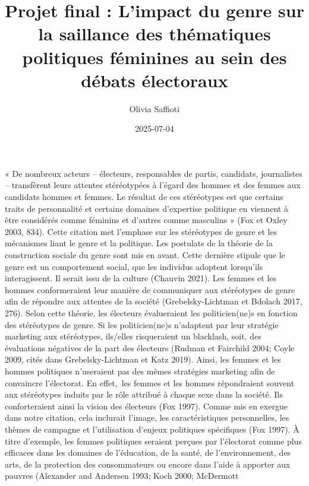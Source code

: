\documentclass[
  letterpaper,
  DIV=11,
  numbers=noendperiod]{scrartcl}
\title{Projet final : L'impact du genre sur la saillance des thématiques
politiques féminines au sein des débats électoraux}
\author{Olivia Saffioti}
\date{2025-07-04}
\begin{document}
\maketitle
\ifdefined\Shaded\renewenvironment{Shaded}{\begin{tcolorbox}[boxrule=0pt, enhanced, borderline west={3pt}{0pt}{shadecolor}, interior hidden, sharp corners, breakable, frame hidden]}{\end{tcolorbox}}\fi

« De nombreux acteurs -- électeurs, responsables de partis, candidats,
journalistes -- transfèrent leurs attentes stéréotypées à l'égard des
hommes et des femmes aux candidats hommes et femmes. Le résultat de ces
stéréotypes est que certains traits de personnalité et certains domaines
d'expertise politique en viennent à être considérés comme féminins et
d'autres comme masculins » (Fox et Oxley 2003, 834). Cette citation met
l'emphase sur les stéréotypes de genre et les mécanismes liant le genre
et la politique. Les postulats de la théorie de la construction sociale
du genre sont mis en avant. Cette dernière stipule que le genre est un
comportement social, que les individus adoptent lorsqu'ils
interagissent. Il serait issu de la culture (Chauvin 2021). Les femmes
et les hommes conformeraient leur manière de communiquer aux stéréotypes
de genre afin de répondre aux attentes de la société (Grebelsky-Lichtman
et Bdolach 2017, 276). Selon cette théorie, les électeurs évalueraient
les politicien(ne)s en fonction des stéréotypes de genre. Si les
politicien(ne)s n'adaptent par leur stratégie marketing aux stéréotypes,
ils/elles risqueraient un blacklash, soit, des évaluations négatives de
la part des électeurs (Rudman et Fairchild 2004; Coyle 2009, cités dans
Grebelsky-Lichtman et Katz 2019). Ainsi, les femmes et les hommes
politiques n'useraient pas des mêmes stratégies marketing afin de
convaincre l'électorat. En effet,~les femmes et les hommes répondraient
souvent aux stéréotypes induits par le rôle attribué à chaque sexe dans
la société. Ils conforteraient ainsi la vision des électeurs (Fox 1997).
Comme mis en exergue dans notre citation, cela inclurait l'image, les
caractéristiques personnelles, les thèmes de campagne et l'utilisation
d'enjeux politiques spécifiques (Fox 1997). À titre d'exemple, les
femmes politiques seraient perçues par l'électorat comme plus efficaces
dans les domaines de l'éducation, de la santé, de l'environnement, des
arts, de la protection des consommateurs ou encore dans l'aide à
apporter aux pauvres (Alexander and Andersen 1993; Koch 2000; McDermott
\end{document}
